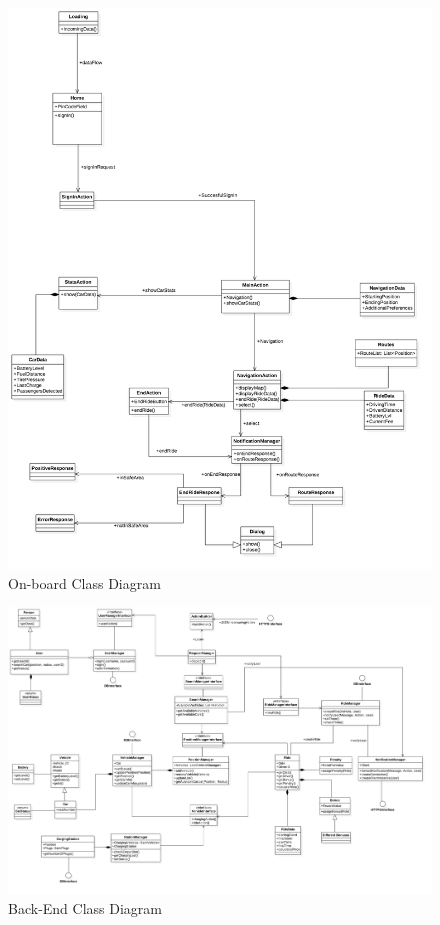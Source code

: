 \FloatBarrier
\begin{figure}
\hspace{-15mm}
\includegraphics[scale=0.35]{Images/ClassDiagram/Display.png}
\caption{On-board Class Diagram}
\end{figure}
\FloatBarrier


\FloatBarrier
\begin{figure}
\includegraphics[scale=0.35]{Images/ClassDiagram/BackEnd2.png}
\caption{Back-End Class Diagram}
\end{figure}
\FloatBarrier
\newpage

